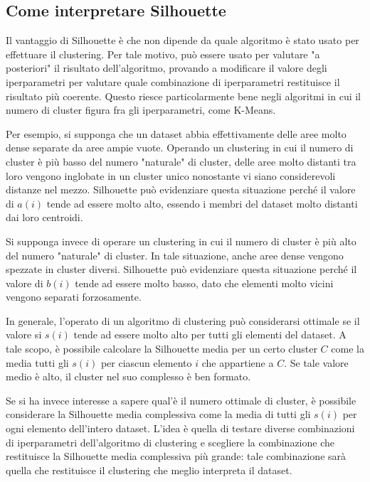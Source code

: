 \documentclass[italian]{article}
\begin{document}
		\subsection{Come interpretare Silhouette}

			Il vantaggio di Silhouette è che non dipende da quale algoritmo
			è stato usato per effettuare il clustering. Per tale motivo, può
			essere usato per valutare "a posteriori" il risultato dell'algoritmo,
			provando a modificare il valore degli iperparametri per valutare
			quale combinazione di iperparametri restituisce il risultato più
			coerente. Questo riesce particolarmente bene negli algoritmi in
			cui il numero di cluster figura fra gli iperparametri, come K-Means.

			Per esempio, si supponga che un dataset abbia effettivamente
			delle aree molto dense separate da aree ampie vuote. Operando
			un clustering in cui il numero di cluster è più basso del numero
			"naturale" di cluster, delle aree molto distanti tra loro vengono
			inglobate in un cluster unico nonostante vi siano considerevoli
			distanze nel mezzo. Silhouette può evidenziare questa situazione
			perché il valore di $a(i)$ tende ad essere molto alto, essendo
			i membri del dataset molto distanti dai loro centroidi.

			Si supponga invece di operare un clustering in cui il numero
			di cluster è più alto del numero "naturale" di cluster. In tale
			situazione, anche aree dense vengono spezzate in cluster diversi.
			Silhouette può evidenziare questa situazione perché il valore di
			$b(i)$ tende ad essere molto basso, dato che elementi molto vicini
			vengono separati forzosamente.

			In generale, l'operato di un algoritmo di clustering può
			considerarsi ottimale se il valore si $s(i)$ tende ad essere
			molto alto per tutti gli elementi del dataset. A tale scopo,
			è possibile calcolare la Silhouette media per un certo cluster
			$C$ come la media tutti gli $s(i)$ per ciascun elemento $i$
			che appartiene a $C$. Se tale valore medio è alto, il cluster
			nel suo complesso è ben formato.

			Se si ha invece interesse a sapere qual'è il numero ottimale di
			cluster, è possibile considerare la Silhouette media complessiva
			come la media di tutti gli $s(i)$ per ogni elemento dell'intero
			dataset. L'idea è quella di testare diverse combinazioni di
			iperparametri dell'algoritmo di clustering e scegliere la
			combinazione che restituisce la Silhouette media complessiva più
			grande: tale combinazione sarà quella che restituisce il clustering
			che meglio interpreta il dataset.
\end{document}

